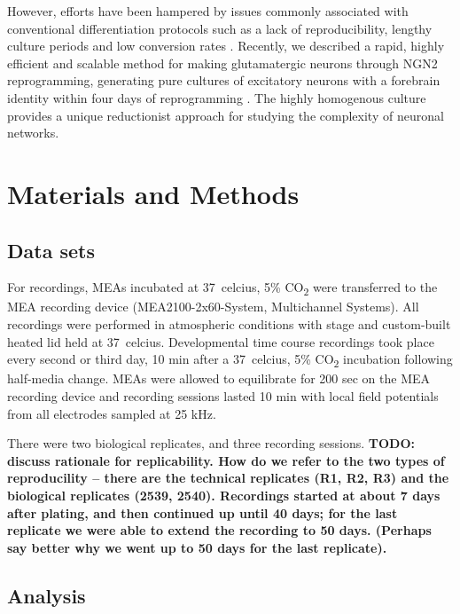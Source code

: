 \documentclass[doublespacing]{bmcart}
\begin{document}
\par However, efforts have been hampered by issues commonly associated with
conventional differentiation protocols such as a lack of
reproducibility, lengthy culture periods and low conversion
rates \cite{Shi2012-of,Kirkeby2012-qw}. Recently, we described a rapid, highly
efficient and scalable method for making glutamatergic neurons through
NGN2 reprogramming, generating pure cultures of excitatory neurons with
a forebrain identity within four days of
reprogramming \cite{Pawlowski2017-qd}. The highly homogenous culture provides
a unique reductionist approach for studying the complexity of neuronal
networks.

\section*{Materials and Methods}

\subsection*{Data sets}
For recordings, MEAs incubated at \SI{37}{celcius}, 5\%
CO\textsubscript{2} were transferred to the MEA recording device
(MEA2100-2x60-System, Multichannel Systems). All recordings were
performed in atmospheric conditions with stage and custom-built heated
lid held at \SI{37}{celcius}. Developmental time course recordings took
place every second or third day, 10 min after a \SI{37}{celcius}, 5\%
CO\textsubscript{2} incubation following half-media change. MEAs were
allowed to equilibrate for 200 sec on the MEA recording device and
recording sessions lasted 10 min with local field potentials from all
electrodes sampled at 25 kHz.

\par There were two biological replicates, and three recording
sessions.  \textbf{TODO: discuss rationale for replicability.  How do we refer to the two types of reproducility -- there are the technical replicates (R1, R2, R3) and the biological replicates (2539, 2540).  Recordings started at about 7 days after plating, and then continued up until 40 days; for the last replicate we were able to extend the recording to 50 days.  (Perhaps say better why we went up to 50 days for the last replicate).}

\subsection*{Analysis}
\end{document}
